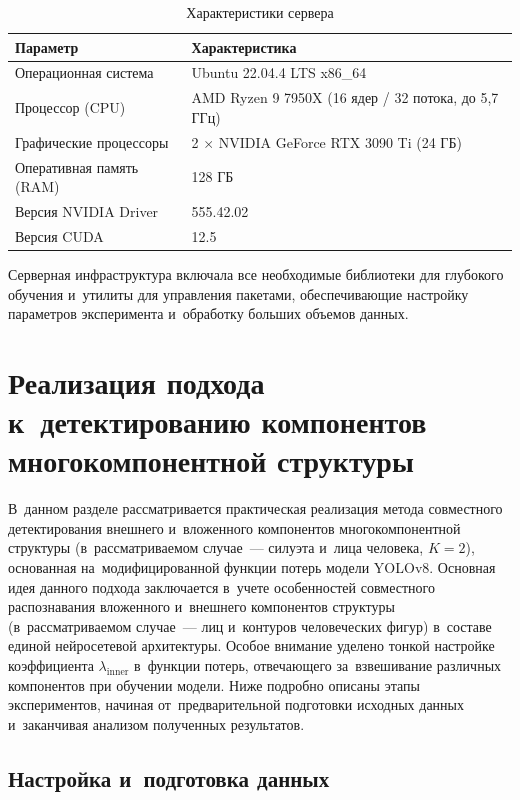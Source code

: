 \begin{table}[htbp]
\centering
\caption{Характеристики сервера}
\label{tab:ch3/server}
\begin{tabular}{ll}
\hline
Параметр & Характеристика \\
\hline
Операционная система & Ubuntu 22.04.4 LTS x86\_64 \\
Процессор (CPU) & AMD Ryzen 9 7950X (16 ядер / 32 потока, до 5,7 ГГц) \\
Графические процессоры & 2 $\times$ NVIDIA GeForce RTX 3090 Ti (24 ГБ) \\
Оперативная память (RAM) & 128 ГБ \\
Версия NVIDIA Driver & 555.42.02 \\
Версия CUDA & 12.5 \\
\hline
\end{tabular}
\end{table}

Серверная инфраструктура включала все необходимые библиотеки для
глубокого обучения и~утилиты для управления пакетами, обеспечивающие
настройку параметров эксперимента и~обработку
больших объемов данных.

\section{Реализация подхода к~детектированию компонентов многокомпонентной структуры}\label{sec:ch3/impl}

В~данном разделе рассматривается практическая реализация метода
совместного детектирования внешнего и~вложенного компонентов многокомпонентной структуры (в~рассматриваемом случае~--- силуэта и~лица человека, $K=2$), основанная на~модифицированной функции
потерь модели YOLOv8. Основная идея данного подхода заключается
в~учете особенностей совместного распознавания вложенного и~внешнего компонентов структуры (в~рассматриваемом случае~--- лиц и~контуров человеческих фигур)
в~составе единой нейросетевой архитектуры. Особое внимание уделено
тонкой настройке коэффициента $\lambda_{\text{inner}}$ в~функции
потерь, отвечающего за~взвешивание различных компонентов при обучении
модели. Ниже подробно описаны этапы экспериментов, начиная
от~предварительной подготовки исходных данных и~заканчивая анализом
полученных результатов.

\subsection{Настройка и~подготовка данных}\label{sec:ch3/data}

